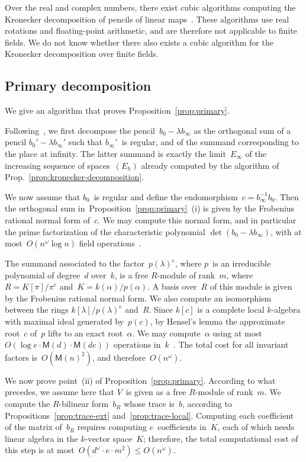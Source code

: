 \documentclass{amsart}
\def\proofof{Proof of }
\def\M{\mathsf{M}}
\begin{document}
Over the real and complex numbers,
there exist cubic algorithms computing the Kronecker decomposition
of pencils of linear maps~\cite{beelen1988improved}.
These algorithms use real rotations and floating-point arithmetic,
and are therefore not applicable to finite fields.
We do not know whether there also exists a cubic algorithm
for the Kronecker decomposition over finite fields.


\subsection{Primary decomposition}
\label{ap:primary}

We give an algorithm that proves
Proposition~\ref{prop:primary}.

Following~\cite[Lemma 4.1]{inventiones1976waterhouse},
we first decompose the pencil~$b_0 - λ b_∞$ as the orthogonal sum of
a pencil $b_0' - λ b_∞'$ such that $b_∞'$~is regular,
and of the summand corresponding to the place at infinity.
The latter summand is exactly
the limit~$E_{∞}$ of the increasing sequence of spaces~$(E_{h})$
already computed by the algorithm of Prop.~\ref{prop:kronecker-decomposition}.

We now assume that $b_0$~is regular
and define the endomorphism~$c = b_∞^{-1} b_0$.
Then the orthogonal sum in~Proposition~\ref{prop:primary}~(i)
is given by the Frobenius rational normal form of~$c$.
We may compute this normal form, and in particular
the prime factorization of the characteristic polynomial $\det (b_0 - λ b_∞)$,
with at most~$O(n^ω \log n)$ field operations~\cite{kaltoffen11compute}.

The summand associated to the factor~$p(λ)^e$,
where $p$~is an irreducible polynomial of degree~$d$ over~$k$,
is a free $R$-module of rank~$m$,
where $R = K[π]/π^e$ and~$K = k(α)/p(α)$.
A basis over~$R$ of this module is given by
the Frobenius rational normal form.
We also compute an isomorphism between the rings $k[λ]/p(λ)^e$ and~$R$.
Since $k[c]$ is a complete local $k$-algebra
with maximal ideal generated by~$p(c)$, by Hensel's lemma
the approximate root~$c$ of~$p$ lifts to an exact root~$α$.
We may compute~$α$ using at most $O(\log e · \M(d) · \M(de))$
operations in~$k$~\cite[Theorem 15.11]{vzgg}.
The total cost for all invariant factors is~$O(\M(n)^2)$,
and therefore~$O(n^ω)$.

\medbreak

We now prove point~(ii) of Proposition~\ref{prop:primary}.
According to what precedes, we assume here that $V$~is given as
a free $R$-module of rank~$m$.
We compute the $R$-bilinear form~$b_R$ whose trace is~$b$,
according to Propositions~\ref{prop:trace-ext} and~\ref{prop:trace-local}.
Computing each coefficient of the matrix of~$b_R$
requires computing $e$~coefficients in~$K$,
each of which needs linear algebra in the $k$-vector space~$K$;
therefore, the total computational cost of this step
is at most~$O(d^ω · e · m^2) ≤ O(n^ω)$.
\end{document}
